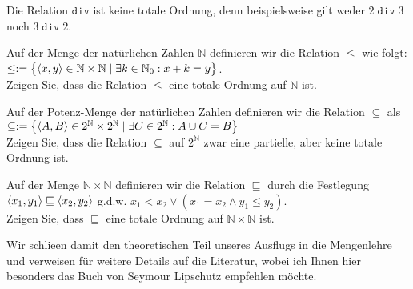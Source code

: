 Die Relation $\mathtt{div}$ ist keine totale Ordnung, denn beispielsweise gilt weder
$2 \mathop{\mathtt{div}} 3$ noch $3 \mathop{\mathtt{div}} 2$.  \exend


\exercise
Auf der Menge der nat\"{u}rlichen Zahlen $\mathbb{N}$ definieren wir die Relation $\leq$ 
wie folgt: 
\\[0.2cm]
\hspace*{1.3cm}
$\leq := \bigl\{ \pair(x,y) \in \mathbb{N} \times \mathbb{N} \mid \exists k \in \mathbb{N}_0: x + k = y \bigr\}$.
\\[0.2cm]
Zeigen Sie, dass die Relation $\leq$ eine totale Ordnung auf $\mathbb{N}$ ist.
\exend

\exercise
Auf der Potenz-Menge der nat\"{u}rlichen Zahlen definieren wir die Relation
$\subseteq$ als 
\\[0.2cm]
\hspace*{1.3cm}
$\subseteq := 
\bigl\{ \pair(A,B) \in 2^\mathbb{N} \times 2^\mathbb{N}\mid \exists C \in 2^\mathbb{N}: A \cup C = B \bigr\}$
\\[0.2cm]
Zeigen Sie, dass die Relation $\subseteq$ auf $2^\mathbb{N}$ zwar eine partielle, aber keine
totale Ordnung ist.
\exend


\exercise
Auf der Menge $\mathbb{N} \times \mathbb{N}$ definieren wir die Relation $\sqsubseteq$ durch die Festlegung
\\[0.2cm]
\hspace*{1.3cm}
$\pair(x_1, y_1) \sqsubseteq \pair(x_2, y_2)$ \quad g.d.w. \quad 
$x_1 < x_2 \vee (x_1 = x_2 \wedge y_1 \leq y_2)$.  
\\[0.2cm]
Zeigen Sie, dass $\sqsubseteq$ eine totale Ordnung auf $\mathbb{N} \times \mathbb{N}$ ist.
\exend
\vspace*{0.3cm}

\noindent
Wir schlie\3en damit den theoretischen Teil unseres Ausflugs in die Mengenlehre und verweisen f\"{u}r weitere
Details auf die Literatur, wobei ich Ihnen hier besonders das Buch von Seymour Lipschutz
\cite{lipschutz:1998} empfehlen m\"{o}chte.  

